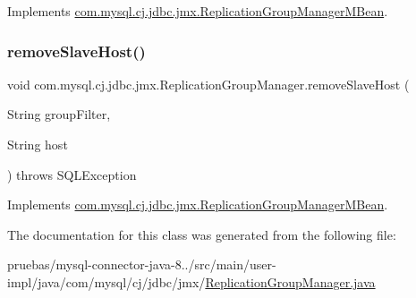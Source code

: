 Implements \mbox{\hyperlink{interfacecom_1_1mysql_1_1cj_1_1jdbc_1_1jmx_1_1_replication_group_manager_m_bean_abcbbf35e0fb141f121eef618b51269a2}{com.\+mysql.\+cj.\+jdbc.\+jmx.\+Replication\+Group\+Manager\+M\+Bean}}.

\mbox{\label{classcom_1_1mysql_1_1cj_1_1jdbc_1_1jmx_1_1_replication_group_manager_a56956d19b252d2f12b5e345a8df2be4b}} 
\subsubsection{\texorpdfstring{remove\+Slave\+Host()}{removeSlaveHost()}}
{\footnotesize\ttfamily void com.\+mysql.\+cj.\+jdbc.\+jmx.\+Replication\+Group\+Manager.\+remove\+Slave\+Host (\begin{DoxyParamCaption}\item[{String}]{group\+Filter,  }\item[{String}]{host }\end{DoxyParamCaption}) throws S\+Q\+L\+Exception}



Implements \mbox{\hyperlink{interfacecom_1_1mysql_1_1cj_1_1jdbc_1_1jmx_1_1_replication_group_manager_m_bean_acd360ef771941ca01b7024688d13a1ca}{com.\+mysql.\+cj.\+jdbc.\+jmx.\+Replication\+Group\+Manager\+M\+Bean}}.



The documentation for this class was generated from the following file\+:\begin{DoxyCompactItemize}
\item 
pruebas/mysql-\/connector-\/java-\/8../src/main/user-\/impl/java/com/mysql/cj/jdbc/jmx/\mbox{\hyperlink{_replication_group_manager_8java}{Replication\+Group\+Manager.\+java}}\end{DoxyCompactItemize}
